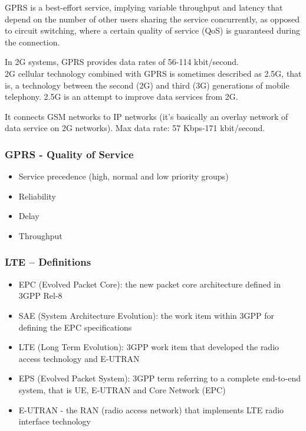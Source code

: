 GPRS is a best-effort service, implying variable throughput and latency that
depend on the number of other users sharing the service concurrently, as
opposed to circuit switching, where a certain quality of service (QoS) is
guaranteed during the connection.

In 2G systems, GPRS provides data rates of 56-114 kbit/second. \\

2G cellular technology combined with GPRS is sometimes described as 2.5G,
that is, a technology between the second (2G) and third (3G) generations of
mobile telephony. 2.5G is an attempt to improve data services from
2G.

It connects GSM networks to IP networks (it's basically an overlay network of
data service on 2G networks). Max data rate: 57 Kbps-171 kbit/second.

\subsubsection{GPRS - Quality of Service}
\begin{itemize}
  \item Service precedence (high, normal and low priority groups)
  \item Reliability
  \item Delay
  \item Throughput
\end{itemize}

\subsubsection{LTE – Definitions}

\begin{itemize}
  \item EPC (Evolved Packet Core): the new packet core architecture defined in
3GPP Rel-8
  \item SAE (System Architecture Evolution): the work item within 3GPP for
defining the EPC specifications
  \item LTE (Long Term Evolution): 3GPP work item that developed the radio
access technology and E-UTRAN
  \item EPS (Evolved Packet System): 3GPP term referring to a complete
end-to-end system, that is UE, E-UTRAN and Core Network (EPC)
  \item E-UTRAN - the RAN (radio access network) that implements LTE radio
interface technology
\end{itemize}

